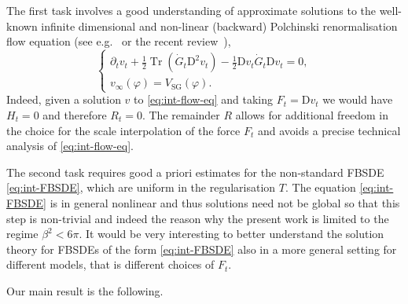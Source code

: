 \documentclass[11pt, a4paper]{scrartcl}
\numberwithin{equation}{section}
\theoremstyle{plain}
\theoremstyle{remark}
\newcommand{\mathD}{\mathrm{D}}
\newcommand{\tmop}[1]{\ensuremath{\operatorname{#1}}}
\begin{document}
The first task involves a good understanding of approximate solutions to the
well-known infinite dimensional and non-linear (backward) Polchinski renormalisation flow
equation (see
e.g.~{\cite{salmhoferRenormalization1999}} or the recent
review~{\cite{bauerschmidtStochasticDynamicsPolchinski}}),
\begin{equation}
	\begin{cases}
		\partial_t v_t + \frac{1}{2} \tmop{Tr} (\dot{G}_t \mathD^2 v_t) -
		\frac{1}{2} \mathD v_t  \dot{G}_t \mathD v_t = 0, \\
		v_{\infty} (\varphi) = V_{\tmop{SG}} (\varphi).
	\end{cases} \label{eq:int-flow-eq}
\end{equation}
Indeed, given a solution $v$ to \eqref{eq:int-flow-eq} and taking $F_t =
	\mathD v_t$ we would have $H_t = 0$ and therefore $R_t = 0$. The remainder $R$
allows for additional freedom in the choice for the scale interpolation of the
force $F_t$ and avoids a precise technical analysis of \eqref{eq:int-flow-eq}.

The second task requires good a priori estimates for the non-standard FBSDE
\eqref{eq:int-FBSDE}, which are uniform in the regularisation $T$. The
equation \eqref{eq:int-FBSDE} is in general nonlinear and thus solutions need
not be global so that this step is non-trivial and indeed the reason why the present
work is limited to the regime $\beta^2 < 6 \pi$. It would be very interesting
to better understand the solution theory for FBSDEs of the form
\eqref{eq:int-FBSDE} also in a more general setting for different models, that
is different choices of $F_t$.

Our main result is the following.
\end{document}
